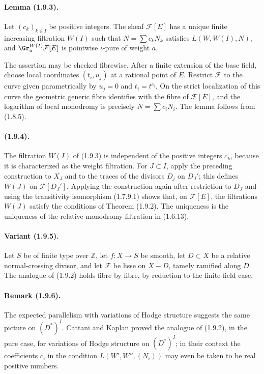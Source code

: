 \paragraph{Lemma (1.9.3).}
Let $(c_k)_{k\in I}$ be positive integers. The sheaf $\mathcal F[E]$ has a unique finite increasing filtration $W(I)$ such that $N=\sum c_kN_k$ satisfies $L(W,W(I),N)$, and $\Gr^{W(I)}_a\mathcal F[E]$ is pointwise $\iota$-pure of weight $a$.

The assertion may be checked fibrewise. After a finite extension of the base field, choose local coordinates $(t_i,u_j)$ at a rational point of $E$. Restrict $\mathcal F$ to the curve given parametrically by $u_j=0$ and $t_i=t^{c_i}$. On the strict localization of this curve the geometric generic fibre identifies with the fibre of $\mathcal F[E]$, and the logarithm of local monodromy is precisely $N=\sum c_iN_i$. The lemma follows from (1.8.5).

\paragraph{(1.9.4).}
The filtration $W(I)$ of (1.9.3) is independent of the positive integers $c_k$, because it is characterized as the weight filtration. For $J\subset I$, apply the preceding construction to $X_J$ and to the traces of the divisors $D_j$ on $D_J'$; this defines $W(J)$ on $\mathcal F[D_J']$. Applying the construction again after restriction to $D_J$ and using the transitivity isomorphism (1.7.9.1) shows that, on $\mathcal F[E]$, the filtrations $W(J)$ satisfy the conditions of Theorem (1.9.2). The uniqueness is the uniqueness of the relative monodromy filtration in (1.6.13).

\paragraph{Variant (1.9.5).}
Let $S$ be of finite type over $\mathbb Z$, let $f:X\to S$ be smooth, let $D\subset X$ be a relative normal-crossing divisor, and let $\mathcal F$ be lisse on $X-D$, tamely ramified along $D$. The analogue of (1.9.2) holds fibre by fibre, by reduction to the finite-field case.

\paragraph{Remark (1.9.6).}
The expected parallelism with variations of Hodge structure suggests the same picture on $(D^*)^I$. Cattani and Kaplan proved the analogue of (1.9.2), in the pure case, for variations of Hodge structure on $(D^*)^I$; in their context the coefficients $c_i$ in the condition $L(W',W'',(N_i))$ may even be taken to be real positive numbers.

